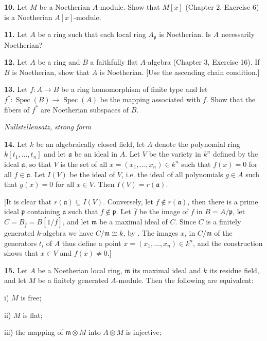 \medskip
\noindent\textbf{10.} Let $M$ be a Noetherian $A$-module.  Show that $M[x]$ (Chapter 2, Exercise 6) is a
Noetherian $A[x]$-module.

\medskip
\noindent\textbf{11.} Let $A$ be a ring such that each local ring $A_\mathfrak p$ is Noetherian.  Is $A$ necessarily
Noetherian?

\medskip
\noindent\textbf{12.} Let $A$ be a ring and $B$ a faithfully flat $A$-algebra (Chapter 3, Exercise 16).  If $B$
is Noetherian, show that $A$ is Noetherian.  [Use the ascending chain condition.]

\medskip
\noindent\textbf{13.} Let $f:A\longrightarrow B$ be a ring homomorphism of finite type and let $f^*:\operatorname{Spec}(B)\longrightarrow
\operatorname{Spec}(A)$ be the mapping associated with $f$.  Show that the fibers of $f^*$ are
Noetherian subspaces of $B$.

\medskip
\noindent\emph{Nullstellensatz, strong form}

\medskip
\noindent\textbf{14.} Let $k$ be an algebraically closed field, let $A$ denote the polynomial ring
$k[t_1,\ldots,t_n]$ and let $\mathfrak a$ be an ideal in $A$.  Let $V$ be the variety in $k^n$ defined by the
ideal $\mathfrak a$, so that $V$ is the set of all $x=(x_1,\ldots,x_n)\in k^n$ such that $f(x)=0$ for all
$f\in\mathfrak a$.  Let $I(V)$ be the ideal of $V$, i.e. the ideal of all polynomials $g\in A$ such that
$g(x)=0$ for all $x\in V$.  Then $I(V)=r(\mathfrak a)$.

[It is clear that $r(\mathfrak a)\subseteq I(V)$.  Conversely, let $f\notin r(\mathfrak a)$, then there is a prime ideal $\mathfrak p$
containing $\mathfrak a$ such that $f\notin\mathfrak p$.  Let $\bar f$ be the image of $f$ in $B=A/\mathfrak p$, let $C=B_{\bar f}=
B[1/\bar f]$, and let $\mathfrak m$ be a maximal ideal of $C$.  Since $C$ is a finitely generated $k$-algebra we have $C/\mathfrak m\cong k$, by .  The images $x_i$ in $C/\mathfrak m$ of the generators $t_i$
of $A$ thus define a point $x=(x_1,\ldots,x_n)\in k^n$, and the construction shows that
$x\in V$ and $f(x)\ne0$.]

\medskip
\noindent\textbf{15.} Let $A$ be a Noetherian local ring, $\mathfrak m$ its maximal ideal and $k$ its residue field, and
let $M$ be a finitely generated $A$-module.  Then the following are equivalent:

i) $M$ is free;

ii) $M$ is flat;

iii) the mapping of $\mathfrak m\otimes M$ into $A\otimes M$ is injective;


